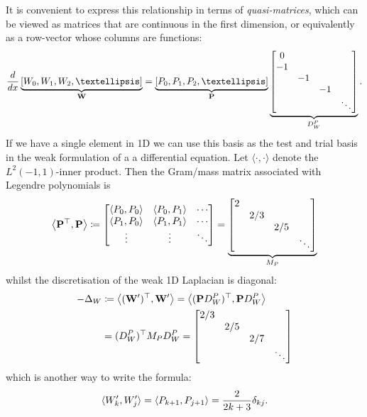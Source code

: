 \documentclass[hidelinks,onefignum,onetabnum]{siamart220329}
\def\bfP{{\bf P}}
\def\bfW{{\bf W}}
\def\ip<#1>{\left\langle{#1}\right\rangle}
\def\D{{\rm d}}
\def\dx{\D x}
\begin{document}
It is convenient to express this relationship in terms of \emph{quasi-matrices}, which can be viewed as matrices that are continuous in the first dimension, or equivalently as a row-vector whose columns are functions:
\[
	{\D \over \dx} \underbrace{[W_0,W_1,W_2,\ensuremath{\ldots}]}_\bfW = \underbrace{[P_0,P_1,P_2,\ensuremath{\ldots}]}_\bfP  \underbrace{\begin{bmatrix} 0 \\ -1 \\ & -1 \\ && -1 \\ &&&\ddots \end{bmatrix}}_{D_W^P}.
\]
If we have a single element in 1D we can use this basis as the test and trial basis in the weak formulation of a  a differential equation. Let $\langle \cdot, \cdot \rangle$ denote the $L^2(-1,1)$-inner product. Then the Gram/mass matrix associated with Legendre polynomials is
\[
	\ip<\bfP^\top, \bfP> \coloneqq \begin{bmatrix}
		\ip<P_0,P_0> & \ip<P_0,P_1>  & \cdots \\
		\ip<P_1,P_0>& \ip<P_1,P_1>  & \cdots \\
		\vdots & \vdots & \ddots 
	\end{bmatrix} = \underbrace{\begin{bmatrix} 2 \\ & 2/3 \\ && 2/5 \\ &&& \ddots \end{bmatrix}}_{M_P}
\]
whilst the  discretisation of the weak 1D Laplacian is diagonal:
\begin{align*}
-\Delta_W &\coloneqq \ip<(\bfW')^\top, \bfW'>  = \ip<(\bfP D_W^P)^\top, \bfP D_W^P> \\
 &= 
(D_W^P)^\top M_P D_W^P = \begin{bmatrix} 2/3 \\ &  2/5  \\ && 2/7 \\ &&& \ddots \end{bmatrix}
\end{align*}
which is another way to write the formula:
\[
\ensuremath{\langle}W_k',W_j'\ensuremath{\rangle} = \ensuremath{\langle}P_{k+1},P_{j+1}\ensuremath{\rangle} =  {2 \over 2k+3}  \ensuremath{\delta}_{kj}.
\]
\end{document}
